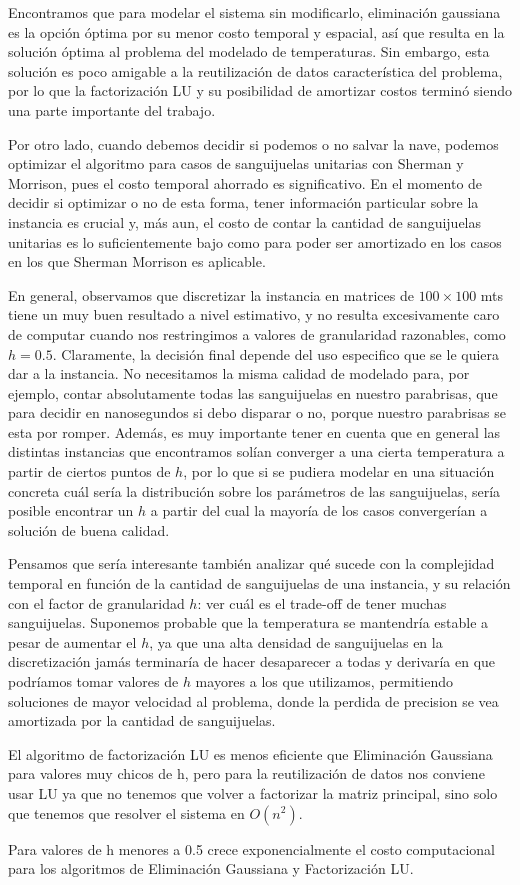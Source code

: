 Encontramos que para modelar el sistema sin modificarlo, eliminación gaussiana es la opción óptima por su menor costo temporal y espacial, así que resulta en la solución óptima al problema del modelado de temperaturas. Sin embargo, esta solución es poco amigable a la reutilización de datos característica del problema, por lo que la factorización LU y su posibilidad de amortizar costos terminó siendo una parte importante del trabajo.

Por otro lado, cuando debemos decidir si podemos o no salvar la nave, podemos optimizar el algoritmo para casos de sanguijuelas unitarias con Sherman y Morrison, pues el costo temporal ahorrado es significativo. En el momento de decidir si optimizar o no de esta forma, tener información particular sobre la instancia es crucial y, más aun, el costo de contar la cantidad de sanguijuelas unitarias es lo suficientemente bajo como para poder ser amortizado en los casos en los que Sherman Morrison es aplicable.

En general, observamos que discretizar la instancia en matrices de $100 \times 100$ mts tiene un muy buen resultado a nivel estimativo, y no resulta excesivamente caro de computar cuando nos restringimos a valores de granularidad razonables, como $h = 0.5$. Claramente, la decisión final depende del uso especifico que se le quiera dar a la instancia. No necesitamos la misma calidad de modelado para, por ejemplo, contar absolutamente todas las sanguijuelas en nuestro parabrisas, que para decidir en nanosegundos si debo disparar o no, porque nuestro parabrisas se esta por romper. Además, es muy importante tener en cuenta que en general las distintas instancias que encontramos solían converger a una cierta temperatura a partir de ciertos puntos de $h$, por lo que si se pudiera modelar en una situación concreta cuál sería la distribución sobre los parámetros de las sanguijuelas, sería posible encontrar un $h$ a partir del cual la mayoría de los casos convergerían a solución de buena calidad.

Pensamos que sería interesante también analizar qué sucede con la complejidad temporal en función de la cantidad de sanguijuelas de una instancia, y su relación con el factor de granularidad $h$: ver cuál es el trade-off de tener muchas sanguijuelas. Suponemos probable que la temperatura se mantendría estable a pesar de aumentar el $h$, ya que una alta densidad de sanguijuelas en la discretización jamás terminaría de hacer desaparecer a todas y derivaría en que podríamos tomar valores de $h$ mayores a los que utilizamos, permitiendo soluciones de mayor velocidad al problema, donde la perdida de precision se vea amortizada por la cantidad de sanguijuelas.

El algoritmo de factorización LU es menos eficiente que Eliminación Gaussiana para valores muy chicos de h, pero para la reutilización de datos nos conviene usar LU ya que no tenemos que volver a factorizar la matriz principal, sino solo que tenemos que resolver el sistema en $O(n^2)$. 

Para valores de h menores a 0.5 crece exponencialmente el costo computacional para los algoritmos de Eliminación Gaussiana y Factorización LU. 
